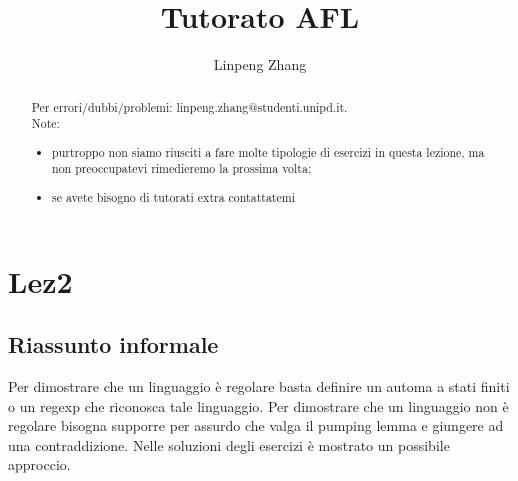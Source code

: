 \documentclass[a4paper,11pt]{article}
\begin{document}
\author{Linpeng Zhang}
\title{Tutorato AFL}
\maketitle
\begin{abstract}
    Per errori/dubbi/problemi: linpeng.zhang@studenti.unipd.it. \\Note: 
    \begin{itemize}
        \item purtroppo non siamo riusciti a fare molte tipologie di esercizi in questa lezione, ma non preoccupatevi rimedieremo la prossima volta;
        \item se avete bisogno di tutorati extra contattatemi
    \end{itemize}
\end{abstract}
\tableofcontents
\section{Lez2}
\subsection{Riassunto informale}
Per dimostrare che un linguaggio è regolare basta definire un automa a stati finiti o un regexp che riconosca tale linguaggio. Per dimostrare che un linguaggio non è regolare bisogna supporre per assurdo che valga il pumping lemma e giungere ad una contraddizione. Nelle soluzioni degli esercizi è mostrato un possibile approccio.
\end{document}

